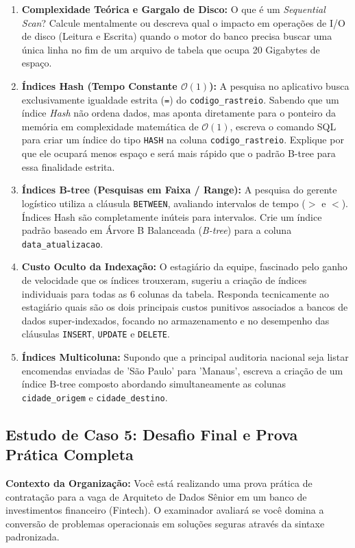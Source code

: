 \begin{enumerate}
    \item \textbf{Complexidade Teórica e Gargalo de Disco:} O que é um \textit{Sequential Scan}? Calcule mentalmente ou descreva qual o impacto em operações de I/O de disco (Leitura e Escrita) quando o motor do banco precisa buscar uma única linha no fim de um arquivo de tabela que ocupa 20 Gigabytes de espaço.
    \item \textbf{Índices Hash (Tempo Constante $\mathcal{O}(1)$):} A pesquisa no aplicativo busca exclusivamente igualdade estrita (\texttt{=}) do \texttt{codigo\_rastreio}. Sabendo que um índice \textit{Hash} não ordena dados, mas aponta diretamente para o ponteiro da memória em complexidade matemática de $\mathcal{O}(1)$, escreva o comando SQL para criar um índice do tipo \texttt{HASH} na coluna \texttt{codigo\_rastreio}. Explique por que ele ocupará menos espaço e será mais rápido que o padrão B-tree para essa finalidade estrita.
    \item \textbf{Índices B-tree (Pesquisas em Faixa / Range):} A pesquisa do gerente logístico utiliza a cláusula \texttt{BETWEEN}, avaliando intervalos de tempo ($>$ e $<$). Índices Hash são completamente inúteis para intervalos. Crie um índice padrão baseado em Árvore B Balanceada (\textit{B-tree}) para a coluna \texttt{data\_atualizacao}. 
    \item \textbf{Custo Oculto da Indexação:} O estagiário da equipe, fascinado pelo ganho de velocidade que os índices trouxeram, sugeriu a criação de índices individuais para todas as 6 colunas da tabela. Responda tecnicamente ao estagiário quais são os dois principais custos punitivos associados a bancos de dados super-indexados, focando no armazenamento e no desempenho das cláusulas \texttt{INSERT}, \texttt{UPDATE} e \texttt{DELETE}.
    \item \textbf{Índices Multicoluna:} Supondo que a principal auditoria nacional seja listar encomendas enviadas de 'São Paulo' para 'Manaus', escreva a criação de um índice B-tree composto abordando simultaneamente as colunas \texttt{cidade\_origem} e \texttt{cidade\_destino}.
\end{enumerate}

\subsection{Estudo de Caso 5: Desafio Final e Prova Prática Completa}

\textbf{Contexto da Organização:}
Você está realizando uma prova prática de contratação para a vaga de Arquiteto de Dados Sênior em um banco de investimentos financeiro (Fintech). O examinador avaliará se você domina a conversão de problemas operacionais em soluções seguras através da sintaxe padronizada.

